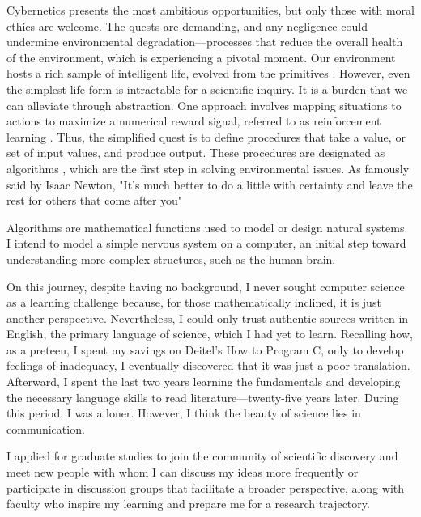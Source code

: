 \documentclass[letterpaper, 10pt]{article}
\begin{document}
\begin{multicols}{2}
	Cybernetics presents the most ambitious opportunities, but only those with moral ethics are welcome. The quests are demanding, and any negligence could undermine environmental degradation—processes that reduce the overall health of the environment, which is experiencing a pivotal moment. Our environment hosts a rich sample of intelligent life, evolved from the primitives \cite{darwin1859origin}. However, even the simplest life form is intractable for a scientific inquiry. It is a burden that we can alleviate through abstraction. One approach involves mapping situations to actions to maximize a numerical reward signal, referred to as reinforcement learning \cite{sutton2020reinforcement}. Thus, the simplified quest is to define procedures that take a value, or set of input values, and produce output. These procedures are designated as algorithms \cite{cormen2022introduction}, which are the first step in solving environmental issues. As famously said by Isaac Newton, "It's much better to do a little with certainty and leave the rest for others that come after you" \cite{campbell2020biology}

	Algorithms are mathematical functions used to model or design natural systems. I intend to model a simple nervous system on a computer, an initial step toward understanding more complex structures, such as the human brain.

	On this journey, despite having no background, I never sought computer science as a learning challenge because, for those mathematically inclined, it is just another perspective. Nevertheless, I could only trust authentic sources written in English, the primary language of science, which I had yet to learn. Recalling how, as a preteen, I spent my savings on Deitel's How to Program C, only to develop feelings of inadequacy, I eventually discovered that it was just a poor translation. Afterward, I spent the last two years learning the fundamentals and developing the necessary language skills to read literature—twenty-five years later. During this period, I was a loner. However, I think the beauty of science lies in communication.

	I applied for graduate studies to join the community of scientific discovery and meet new people with whom I can discuss my ideas more frequently or participate in discussion groups that facilitate a broader perspective, along with faculty who inspire my learning and prepare me for a research trajectory.

	\printbibliography
\end{multicols}
\end{document}
